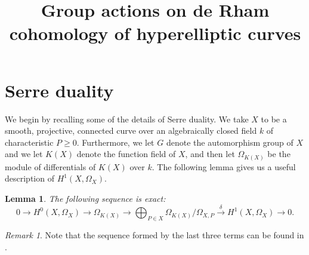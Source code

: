 \documentclass[draft, 11pt]{article} %
\title{Group actions on de Rham cohomology of hyperelliptic curves}
\author{}
\theoremstyle{plain}
\newtheorem{lem}[defn]{Lemma}
\theoremstyle{remark}
\newtheorem*{rem}{Remark}
\newcommand{\ra}{\rightarrow}
\newcommand{\hzero}{{H^0(X,\Omega_X)}}
\begin{document}
\maketitle

\listoftodos


\section{Serre duality}


We begin by recalling some of the details of Serre duality.
We take $X$ to be a smooth, projective, connected curve over an algebraically closed field $k$ of characteristic $P \geq 0$.
Furthermore, we let $G$ denote the automorphism group of $X$ and we let $K(X)$ denote the function field of $X$, and then let $\Omega_{K(X)}$ be the module of differentials of $K(X)$ over $k$.
The following lemma gives us a useful description of $H^1(X,\Omega_X)$.
\begin{lem}\label{exactsequencelemma}
The following sequence is exact:
\begin{equation}\label{dualityses}
0 \rightarrow \hzero \ra \Omega_{K(X)} \ra \bigoplus_{P \in X}\Omega_{K(X)}/\Omega_{X,P} \xrightarrow{\delta} H^1(X,\Omega_X) \ra 0.
\end{equation}
\end{lem}
\begin{rem}
Note that the sequence formed by the last three terms can be found in \cite[Pg. 248]{hart}.
\end{rem}
\end{document}

